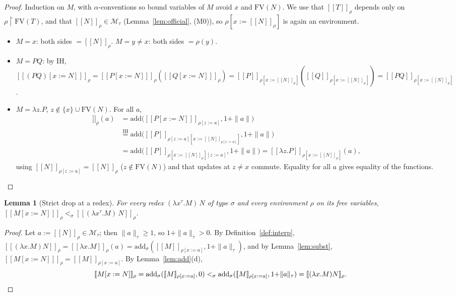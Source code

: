 \documentclass{amsart}
\newtheorem{lemma}{Lemma}
\theoremstyle{definition}
\newcommand{\interp}[1]{[\![#1]\!]}
\newcommand{\FV}{\mathrm{FV}}
\begin{document}
\begin{proof}
Induction on $M$, with $\alpha$-conventions so bound variables of $M$ avoid $x$ and
$\FV(N)$. We use that $\interp{T}_\rho$ depends only on $\rho{\restriction}\FV(T)$, and that
$\interp{N}_\rho\in\mathcal M_\tau$ (Lemma~\ref{lem:official}, (M0)), so
$\rho[x:=\interp N_\rho]$ is again an environment.
\begin{itemize}
\item $M=x$: both sides $=\interp N_\rho$. \quad $M=y\neq x$: both sides $=\rho(y)$.
\item $M=PQ$: by IH, $\interp{(PQ)[x:=N]}_\rho=\interp{P[x:=N]}_\rho(\interp{Q[x:=N]}_\rho)
  =\interp{P}_{\rho[x:=\interp N_\rho]}(\interp{Q}_{\rho[x:=\interp N_\rho]})
  =\interp{PQ}_{\rho[x:=\interp N_\rho]}$.
\item $M=\lambda z.P$, $z\notin\{x\}\cup\FV(N)$. For all $a$,
  \begin{align*}
   \interp{(\lambda z.P)[x:=N]}_\rho(a)
   &=\mathrm{add}\bigl(\interp{P[x:=N]}_{\rho[z:=a]},1{+}\|a\|\bigr)\\
   &\overset{\text{IH}}{=}\mathrm{add}\bigl(\interp{P}_{\rho[z:=a][x:=\interp N_{\rho[z:=a]}]},1{+}\|a\|\bigr)\\
   &=\mathrm{add}\bigl(\interp{P}_{\rho[x:=\interp N_\rho][z:=a]},1{+}\|a\|\bigr)
   =\interp{\lambda z.P}_{\rho[x:=\interp N_\rho]}(a),
  \end{align*}
  using $\interp N_{\rho[z:=a]}=\interp N_\rho$ ($z\notin\FV(N)$) and that updates at
  $z\neq x$ commute. Equality for all $a$ gives equality of the functions.
\end{itemize}
\end{proof}

\begin{lemma}[Strict drop at a redex]\label{lem:redex}
For every redex $(\lambda x^\tau.M)\,N$ of type $\sigma$ and every environment $\rho$ on its
free variables, $\interp{M[x:=N]}_\rho<_\sigma\interp{(\lambda x^\tau.M)\,N}_\rho$.
\end{lemma}

\begin{proof}
Let $a:=\interp N_\rho\in\mathcal M_\tau$; then $\|a\|_\tau\ge1$, so $1+\|a\|_\tau>0$. By
Definition~\ref{def:interp},
$\interp{(\lambda x.M)N}_\rho=\interp{\lambda x.M}_\rho(a)=
\mathrm{add}_\sigma(\interp{M}_{\rho[x:=a]},1{+}\|a\|_\tau)$, and by Lemma~\ref{lem:subst},
$\interp{M[x:=N]}_\rho=\interp{M}_{\rho[x:=a]}$. By Lemma~\ref{lem:add}(d),
\[
  \interp{M[x:=N]}_\rho=\mathrm{add}_\sigma(\interp{M}_{\rho[x:=a]},0)
  <_\sigma\mathrm{add}_\sigma(\interp{M}_{\rho[x:=a]},1{+}\|a\|_\tau)=\interp{(\lambda x.M)N}_\rho.\qedhere
\]
\end{proof}
\end{document}
